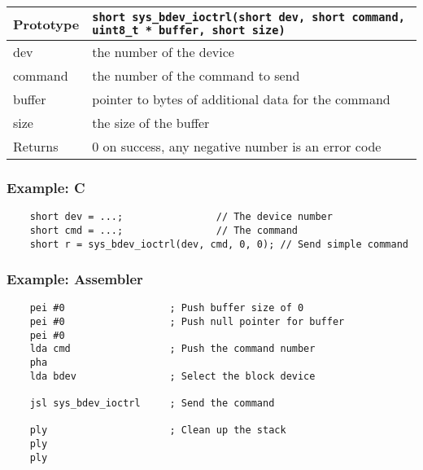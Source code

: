 \bigskip

\begin{tabular}{|l||l|} \hline
Prototype & \lstinline!short sys_bdev_ioctrl(short dev, short command, uint8_t * buffer, short size)! \\ \hline
dev & the number of the device \\ \hline
command & the number of the command to send \\ \hline
buffer & pointer to bytes of additional data for the command \\ \hline
size & the size of the buffer \\ \hline
Returns & 0 on success, any negative number is an error code \\ \hline
\end{tabular}

\subsubsection*{Example: C}
\begin{lstlisting}
    short dev = ...;                // The device number
    short cmd = ...;                // The command
    short r = sys_bdev_ioctrl(dev, cmd, 0, 0); // Send simple command
\end{lstlisting}

\subsubsection*{Example: Assembler}
\begin{verbatim}
    pei #0                  ; Push buffer size of 0
    pei #0                  ; Push null pointer for buffer
    pei #0
    lda cmd                 ; Push the command number
    pha
    lda bdev                ; Select the block device
    
    jsl sys_bdev_ioctrl     ; Send the command

    ply                     ; Clean up the stack
    ply
    ply
\end{verbatim}